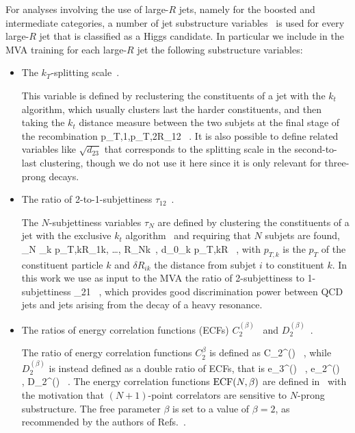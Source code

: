 For analyses involving the use of large-$R$ jets,
namely for the boosted and intermediate categories,
a number of jet substructure variables~\cite{Salam:2009jx,Aad:2013gja} is used
for every large-$R$ jet that is classified as a Higgs candidate.
%
In particular we include in the MVA training for each large-$R$ jet the following
substructure variables:
\begin{itemize}
\item The $k_T$-splitting scale~\cite{Butterworth:2002tt,Butterworth:2008iy}.

  This variable is defined by reclustering the constituents of a jet with the
  $k_t$ algorithm, which usually clusters last the harder constituents, and then
  taking the $k_t$ distance measure between the two subjets at the final stage of the recombination
  \be
  \label{eq:ktsplitting}
 \lp p_{T,1},p_{T,2}\rp \cdot \Delta R_{12} \, .
\ee
It is also possible to define related variables like $\sqrt{d_{23}}$
that corresponds to the
splitting scale in the second-to-last clustering, though we do not use
it here since it is only relevant for three-prong decays.
  
\item The ratio of 2-to-1-subjettiness $\tau_{12}$~\cite{Thaler:2010tr,Thaler:2011gf}.

  The $N$-subjettiness variables $\tau_N$ are defined by clustering the constituents
  of a jet with the exclusive $k_t$ algorithm~\cite{Catani:1993hr}
  and requiring that $N$ subjets are found,
  \be
  \tau_N \equiv {} \sum_k p_{T,k}\lp \delta R_{1k}, \ldots,
  \delta R_{Nk}\rp \, , \qquad d_0\equiv \sum_k p_{T,k}\cdot R \, ,
  \ee
  with $p_{T,k}$ is the $p_T$ of the constituent particle $k$ and $\delta R_{ik}$ the distance from
  subjet $i$ to constituent $k$.
  In this work we use as input to the MVA the ratio of 2-subjettiness to 1-subjettiness
  \be
  \label{eq:tau21}
\tau_{21} \equiv {} \, ,
  \ee
  which provides good discrimination power
  between QCD jets and jets arising from the decay of
  a heavy resonance.
  
\item The ratios of energy correlation functions (ECFs)  $C^{(\beta)}_2$~\cite{Larkoski:2013eya} and
  $D_2^{(\beta)}$~\cite{Larkoski:2014gra}.

  The ratio of energy correlation functions $C_2^{\beta}$ is defined as
  \be
  \label{eq:c2}
C_2^{(\beta)} \equiv {} \, ,
\ee
while $D_2^{(\beta)}$ is instead defined as a double ratio of ECFs, that is
\be
e_3^{(\beta)}\equiv {} \, , \quad
  e_2^{(\beta)}\equiv {} \, , \quad
  \label{eq:d2}
D_2^{(\beta)} \equiv {} \, .
\ee
The energy correlation functions ${\rm ECF}(N,\beta)$ are defined
  in~\cite{Larkoski:2013eya} with the motivation that $(N+1)$-point correlators
  are sensitive to $N$-prong substructure.
  The free parameter $\beta$ is set to a value of $\beta=2$,
  as recommended by the authors of Refs.~\cite{Larkoski:2013eya,Larkoski:2014gra}.
\end{itemize}
